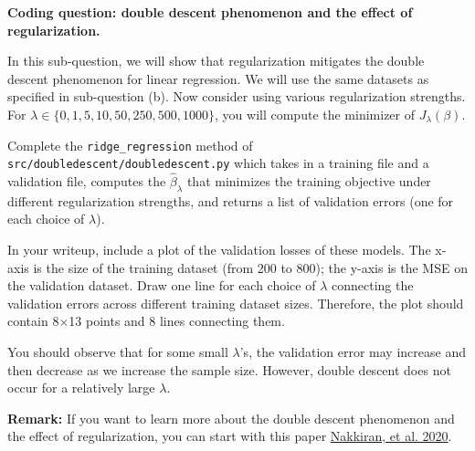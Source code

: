 \item {} \textbf{Coding question: double descent phenomenon and the effect of regularization. }

In this sub-question, we will show that regularization mitigates the double descent phenomenon for linear regression. We will use the same datasets as specified in sub-question (b). Now consider using various regularization strengths. For $\lambda\in \{0, 1, 5, 10, 50, 250, 500, 1000\}$, you will compute the minimizer of $J_\lambda(\beta).$ 

Complete the \texttt{ridge\_regression} method of \texttt{src/doubledescent/doubledescent.py} which takes in a training file and a validation file, computes the $\hat{\beta}_\lambda$ that minimizes the training objective under different regularization strengths, and returns a list of validation errors (one for each choice of $\lambda$).

In your writeup, include a plot of the validation losses of these models. The x-axis is the size of the training dataset (from 200 to 800); the y-axis is the MSE on the validation dataset. Draw one line for each choice of $\lambda$ connecting the validation errors across different training dataset sizes. Therefore, the plot should contain 8$\times$13 points and 8 lines connecting them. 

You should observe that for some small $\lambda$'s, the validation error may increase and then decrease as we increase the sample size. However, double descent does not occur for a relatively large $\lambda$. 

\textbf{Remark:} If you want to learn more about the double descent phenomenon and the effect of regularization, you can start with this paper \href{https://arxiv.org/abs/2003.01897}{Nakkiran, et al. 2020}.
